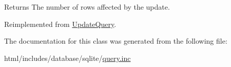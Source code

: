 \begin{DoxyReturn}{Returns}
The number of rows affected by the update. 
\end{DoxyReturn}


Reimplemented from \hyperlink{classUpdateQuery_a8a90104d1f7aa75cda332b569fd566b9}{UpdateQuery}.

The documentation for this class was generated from the following file:\begin{DoxyCompactItemize}
\item 
html/includes/database/sqlite/\hyperlink{sqlite_2query_8inc}{query.inc}\end{DoxyCompactItemize}
